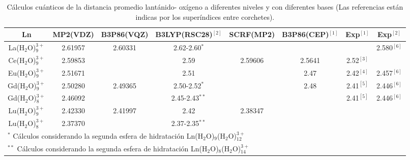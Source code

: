  \begin{center}                                                                            
 \begin{table}[h!]\label{t2}                                                               
 \caption{\footnotesize C\'alculos cu\'anticos de la distancia promedio 
 lant\'anido- ox\'igeno a diferentes niveles y con diferentes bases 
 (Las referencias est\'an indicas por los super\'indices entre corchetes).}                                                                  
 \begin{tabular}{c|ccccccc}\hline\hline                                                          
    Ln           & MP2(VDZ) &  B3P86(VQZ) & B3LYP(RSC28)$^{[2]}$ & SCRF(MP2) & B3P86(CEP)$^{[1]}$ & Exp$^{[1]}$ & Exp$^{[2]}$  \\ \hline
La(H$_2$O)$_9^{3+}$ & 2.61957  &  2.60331    &2.62-2.60$^*$     &           &                &           & 2.580$^{[6]}$ \\
Ce(H$_2$O)$_9^{3+}$ & 2.59853  &             &   2.59           & 2.59606   &  2.5641        & 2.52$^{[3]}$  &           \\
Eu(H$_2$O)$_9^{3+}$ & 2.51671  &             &   2.51           &           &  2.47          & 2.42$^{[4]}$  & 2.457$^{[6]}$ \\
Gd(H$_2$O)$_9^{3+}$ & 2.50280  &  2.49365    &2.50-2.52$^*$     &           &  2.48          & 2.41$^{[5]}$  & 2.446$^{[6]}$ \\
Gd(H$_2$O)$_8^{3+}$ & 2.46092  &             &2.45-2.43$^{**}$  &           &                & 2.41$^{[5]}$  & 2.446$^{[6]}$ \\
Lu(H$_2$O)$_9^{3+}$ & 2.42330  &  2.41997    &   2.42           & 2.38347   &                &           &           \\
Lu(H$_2$O)$_8^{3+}$ & 2.37370  &             &2.37-2.35$^{**}$  &           &                &           &           \\ \hline 
\multicolumn{7}{l}{\tiny $^*$ C\'alculos considerando la segunda esfera de hidrataci\'on Ln(H$_2$O)$_9$(H$_2$O)$^{3+}_{12}$} \\
\multicolumn{7}{l}{\tiny $^{**}$ C\'alculos considerando la segunda esfera de hidrataci\'on Ln(H$_2$O)$_8$(H$_2$O)$^{3+}_{14}$} \\
\end{tabular}
\end{table}                                                           
 \end{center}                                                                              
